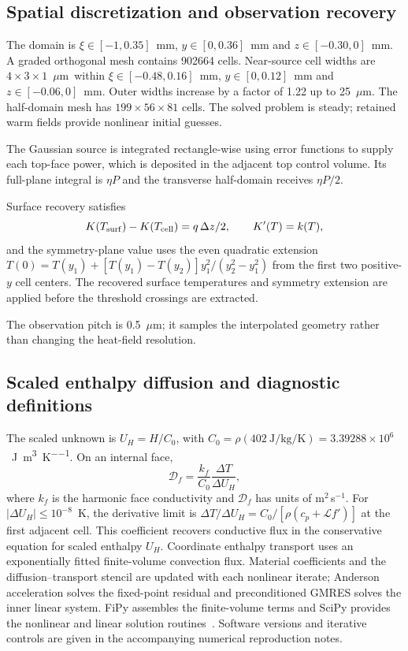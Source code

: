 \documentclass[preprint,12pt]{elsarticle}
\newcommand{\um}{\ensuremath{\mu\mathrm{m}}}
\begin{document}
\subsection{Spatial discretization and observation recovery}
The domain is $\xi\in[-1,0.35]$~mm, $y\in[0,0.36]$~mm and $z\in[-0.30,0]$~mm. A graded orthogonal mesh contains 902664 cells. Near-source cell widths are $4\times3\times1$~\um\ within $\xi\in[-0.48,0.16]$~mm, $y\in[0,0.12]$~mm and $z\in[-0.06,0]$~mm. Outer widths increase by a factor of 1.22 up to 25~\um. The half-domain mesh has $199\times56\times81$ cells. The solved problem is steady; retained warm fields provide nonlinear initial guesses.

The Gaussian source is integrated rectangle-wise using error functions to supply each top-face power, which is deposited in the adjacent top control volume. Its full-plane integral is $\eta P$ and the transverse half-domain receives $\eta P/2$.

Surface recovery satisfies
\begin{equation}
 K(T_{\rm surf})-K(T_{\rm cell})=q\,\Delta z/2,\qquad K'(T)=k(T),
\end{equation}
and the symmetry-plane value uses the even quadratic extension $T(0)=T(y_1)+[T(y_1)-T(y_2)]y_1^2/(y_2^2-y_1^2)$ from the first two positive-$y$ cell centers. The recovered surface temperatures and symmetry extension are applied before the threshold crossings are extracted.

The observation pitch is 0.5~\um; it samples the interpolated geometry rather than changing the heat-field resolution.

\subsection{Scaled enthalpy diffusion and diagnostic definitions}
The scaled unknown is $U_H=H/C_0$, with $C_0=\rho(402~\si{\joule\per\kilogram\per\kelvin})=3.39288\times10^6$~\si{\joule\per\cubic\metre\per\kelvin}. On an internal face,
\begin{equation}
 \mathcal D_f=\frac{k_f}{C_0}\frac{\Delta T}{\Delta U_H},
 \label{eq:face}
\end{equation}
where $k_f$ is the harmonic face conductivity and $\mathcal D_f$ has units of m$^2$\,s$^{-1}$. For $|\Delta U_H|\leq10^{-8}$~K, the derivative limit is $\Delta T/\Delta U_H=C_0/[\rho(c_p+\mathcal L f')]$ at the first adjacent cell. This coefficient recovers conductive flux in the conservative equation for scaled enthalpy $U_H$. Coordinate enthalpy transport uses an exponentially fitted finite-volume convection flux. Material coefficients and the diffusion--transport stencil are updated with each nonlinear iterate; Anderson acceleration solves the fixed-point residual and preconditioned GMRES solves the inner linear system. FiPy assembles the finite-volume terms and SciPy provides the nonlinear and linear solution routines~\cite{fipy2009,scipy2020}. Software versions and iterative controls are given in the accompanying numerical reproduction notes.
\end{document}
